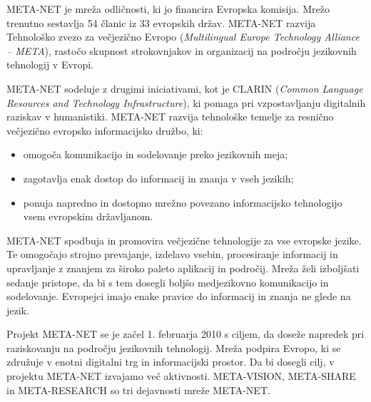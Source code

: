 \cleardoublepage



\begin{multicols}{2}

META-NET je mreža odličnosti, ki jo financira Evropska komisija. Mrežo trenutno sestavlja 54 članic iz 33 evropskih držav\cite{rehm2011}. META-NET razvija Tehnološko zvezo za večjezično Evropo (\textit{Multilingual Europe Technology Alliance – META}), rastočo skupnost strokovnjakov in organizacij na področju jezikovnih tehnologij v Evropi.

META-NET sodeluje z drugimi iniciativami, kot je CLARIN (\textit{Common Language Resources and Technology Infrastructure}), ki pomaga pri vzpostav\-ljanju digitalnih raziskav v humanistiki. META-NET razvija tehnološke temelje za resnično večjezič\-no evropsko informacijsko družbo, ki:

\begin{itemize}
\item omogoča komunikacijo in sodelovanje preko jezikovnih meja;
\item zagotavlja enak dostop do informacij in znanja v vseh jezikih;
\item ponuja napredno in dostopno mrežno povezano informacijsko tehnologijo vsem evropskim državljanom.
\end{itemize}

META-NET spodbuja in promovira večjezične tehnologije za vse evropske jezike. Te omogočajo strojno prevajanje, izdelavo vsebin, procesiranje informacij in upravljanje z znanjem za široko paleto aplikacij in področij. Mreža želi izboljšati sedanje pristope, da bi s tem dosegli boljšo medjezikovno komunikacijo in sodelovanje. Evropejci imajo enake pravice do informacij in znanja ne glede na jezik.

Projekt META-NET se je začel 1. februarja 2010 s ciljem, da doseže napredek pri raziskovanju na področju jezikovnih tehnologij. Mreža podpira Evropo, ki se združuje v enotni digitalni trg in informacijski prostor. Da bi dosegli cilj, v projektu META-NET izvajamo več aktivnosti. META-VISION, META-SHARE in META-RESEARCH so tri dejavnosti mreže META-NET.


\end{multicols}
